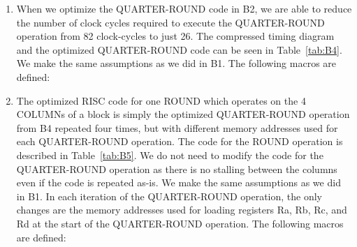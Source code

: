 \begin{enumerate}[wide, label=(B\arabic*)]
\item When we optimize the QUARTER-ROUND code in B2, we are able to reduce the number of clock cycles required to execute the QUARTER-ROUND operation from 82 clock-cycles to just 26. The compressed timing diagram and the optimized QUARTER-ROUND code can be seen in Table~\ref{tab:B4}. We make the same assumptions as we did in B1. The following macros are defined:


\item The optimized RISC code for one ROUND which operates on the 4 COLUMNs of a block is simply the optimized QUARTER-ROUND operation from B4 repeated four times, but with different memory addresses used for each QUARTER-ROUND operation. The code for the ROUND operation is described in Table~\ref{tab:B5}. We do not need to modify the code for the QUARTER-ROUND operation as there is no stalling between the columns even if the code is repeated as-is. We make the same assumptions as we did in B1. In each iteration of the QUARTER-ROUND operation, the only changes are the memory addresses used for loading registers Ra, Rb, Rc, and Rd at the start of the QUARTER-ROUND operation. The following macros are defined:



\end{enumerate}
